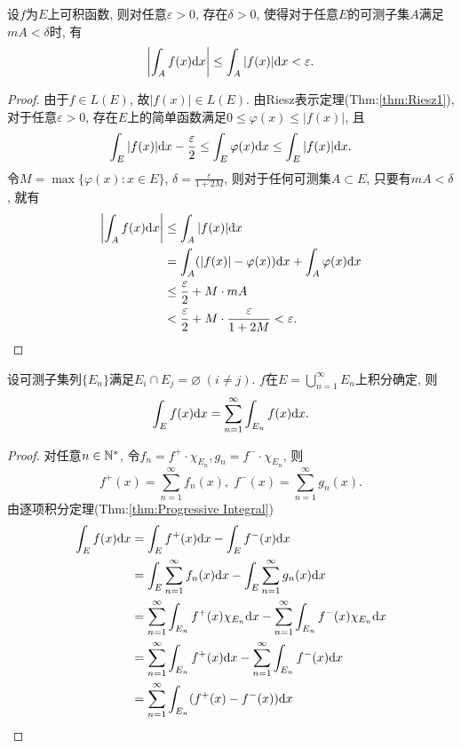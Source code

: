 \vskip 0.2cm
\begin{theorem}[$L$积分的绝对连续性]
	设$f$为$E$上可积函数, 则对任意$\varepsilon > 0$, 存在$\delta > 0$, 
	使得对于任意$E$的可测子集$A$满足$mA < \delta$时, 有
	\begin{equation}
		\left| \int_A f(x) \mathrm{d} x \right| \leq \int_A |f(x)| \mathrm{d} x < \varepsilon.
	\end{equation}
\end{theorem}
\begin{proof}
	由于$f \in L(E)$, 故$|f(x)| \in L(E)$. 
	由Riesz表示定理(Thm:\ref{thm:Riesz1}), 对于任意$\varepsilon > 0$, 
	存在$E$上的简单函数满足$0 \leq \varphi(x) \leq |f(x)|$, 且
	$$
		\int_E |f(x)| \mathrm{d} x - \frac{\varepsilon}{2} 
		\leq \int_E \varphi(x) \mathrm{d} x
		\leq \int_E |f(x)| \mathrm{d} x.
	$$
	令$M = \max \{ \varphi(x): x \in E \}$, 
	$\delta = \frac{\varepsilon}{1 + 2M}$, 
	则对于任何可测集$A \subset E$, 只要有$mA < \delta$, 就有
	$$
	\begin{aligned}
		\left| \int_A f(x) \mathrm{d} x \right| 
		&\leq \int_A |f(x)| \mathrm{d} x \\
		&= \int_A (|f(x)| - \varphi(x)) \mathrm{d} x + \int_A \varphi(x) \mathrm{d} x \\
		&\leq \frac{\varepsilon}{2} + M \cdot mA \\
		&< \frac{\varepsilon}{2} + M \cdot \frac{\varepsilon}{1 + 2M} 
		< \varepsilon. 
	\end{aligned}
	$$
\end{proof}

\begin{theorem}[$L$积分对定义域的可数可加性]
	设可测子集列$\{ E_n \}$满足$E_i \cap E_j = \varnothing \; (i \neq j)$. 
	$f$在$E = \bigcup\limits_{n = 1}^{\infty} E_n$上积分确定, 则
	\begin{equation}
		\int_E f(x) \mathrm{d} x = \sum\limits_{n = 1}^{\infty} \int_{E_n} f(x) \mathrm{d} x.
	\end{equation}
\end{theorem}
\begin{proof}
	对任意$n \in \mathbb{N}^*$, 
	令$f_n = f^+ \cdot \chi_{E_n}, g_n = f^- \cdot \chi_{E_n}$, 则
	$$
		f^+(x) = \sum\limits_{n = 1}^{\infty} f_n(x) , \;
		f^-(x) = \sum\limits_{n = 1}^{\infty} g_n(x) . 
	$$
	由逐项积分定理(Thm:\ref{thm:Progressive Integral})
	$$
	\begin{aligned}
		\int_E f(x) \mathrm{d} x
		&= \int_E f^+(x) \mathrm{d} x - \int_E f^-(x) \mathrm{d} x \\
		&= \int_E \sum\limits_{n = 1}^{\infty} f_n(x) \mathrm{d} x 
			- \int_E \sum\limits_{n = 1}^{\infty} g_n(x) \mathrm{d} x \\
		&= \sum\limits_{n = 1}^{\infty} \int_{E_n} f^+(x) \chi_{E_n} \mathrm{d} x
			- \sum\limits_{n = 1}^{\infty} \int_{E_n} f^-(x) \chi_{E_n} \mathrm{d} x \\
		&= \sum\limits_{n = 1}^{\infty} \int_{E_n} f^+(x) \mathrm{d} x
			- \sum\limits_{n = 1}^{\infty} \int_{E_n} f^-(x) \mathrm{d} x \\
		&= \sum\limits_{n = 1}^{\infty} \int_{E_n} (f^+(x) - f^-(x)) \mathrm{d} x
	\end{aligned}
	$$
\end{proof}



